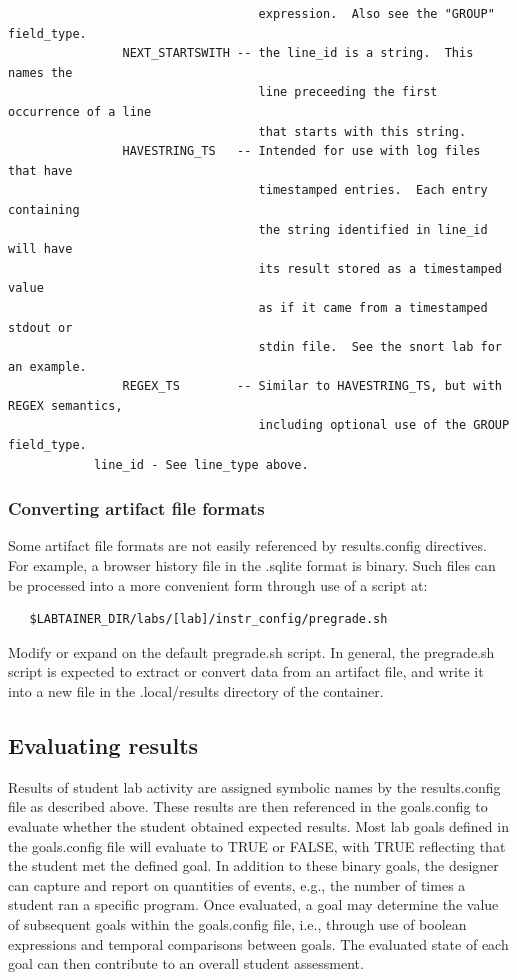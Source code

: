 \documentclass[12pt]{article}
\begin{document}
\begin{verbatim}
                                   expression.  Also see the "GROUP" field_type.
                NEXT_STARTSWITH -- the line_id is a string.  This names the 
                                   line preceeding the first occurrence of a line 
                                   that starts with this string. 
                HAVESTRING_TS   -- Intended for use with log files that have 
                                   timestamped entries.  Each entry containing
                                   the string identified in line_id will have
                                   its result stored as a timestamped value
                                   as if it came from a timestamped stdout or 
                                   stdin file.  See the snort lab for an example.
                REGEX_TS        -- Similar to HAVESTRING_TS, but with REGEX semantics,
                                   including optional use of the GROUP field_type.
            line_id - See line_type above.
\end{verbatim}

\subsubsection{Converting artifact file formats}
Some artifact file formats are not easily referenced by results.config directives.
For example, a browser history file in the .sqlite format is binary.  Such files
can be processed into a more convenient form through use of a script at:
\begin{verbatim}
   $LABTAINER_DIR/labs/[lab]/instr_config/pregrade.sh
\end{verbatim}
\noindent Modify or expand on the default pregrade.sh script.
In general, the pregrade.sh script is expected to extract or convert
data from an artifact file, and write it into a new file in the .local/results
directory of the container.   

\subsection{Evaluating results}
\label{goals.config}
Results of student lab activity are assigned symbolic names by the results.config file
as described above.  These results are then referenced in the goals.config to evaluate whether
the student obtained expected results.  Most lab goals defined in the goals.config file
will evaluate to TRUE or FALSE, with TRUE reflecting that the student met the defined goal.
In addition to these binary goals, the designer can capture and report on quantities of events,
e.g., the number of times a student ran a specific program.
Once evaluated, a goal may determine the value of subsequent goals within the goals.config file, 
i.e., through use of boolean expressions and temporal comparisons between goals.  The evaluated
state of each goal can then contribute to an overall student assessment.
\end{document}

